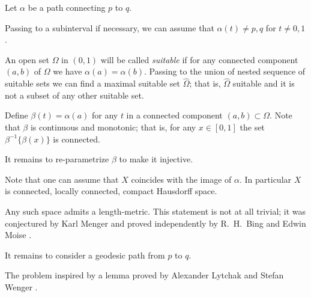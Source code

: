 Let $\alpha$ be a path connecting $p$ to $q$.

Passing to a subinterval if necessary,
we can assume that $\alpha(t)\ne p,q$ for $t\ne0,1$.

An open set $\Omega$ in $(0,1)$ will be called {}\emph{suitable}
if for any connected component $(a,b)$ of $\Omega$ we have $\alpha(a)=\alpha(b)$.
Passing to the union of nested sequence of suitable sets we can find a maximal suitable set $\hat \Omega$;
that is, $\hat \Omega$ suitable and it is not a subset of any other suitable set.

Define $\beta(t)=\alpha(a)$ for any $t$ in a connected component $(a,b)\subset\Omega$.
Note that $\beta$ is continuous and monotonic;
that is, for any $x\in [0,1]$ the set $\beta^{-1}\{\beta(x)\}$ is connected.

It remains to re-parametrize $\beta$ to make it injective.
\qeds

Note that one can assume that $X$ coincides with the image of $\alpha$.
In particular $X$ is connected, locally connected, compact Hausdorff space.

Any such space admits a length-metric.
This statement is not at all trivial;
it was conjectured by Karl Menger \cite[see][]{menger}
and proved independently 
by R.~H.~Bing  \cite[see][]{bing-length-0, bing-length-1} 
and Edwin Moise \cite[see][]{moise}.

It remains to consider a geodesic path from $p$ to $q$.
\qeds

The problem inspired by a lemma 
proved by 
Alexander Lytchak
and Stefan Wenger \cite[see 7.13 in][]{lytchak-wenger}.


